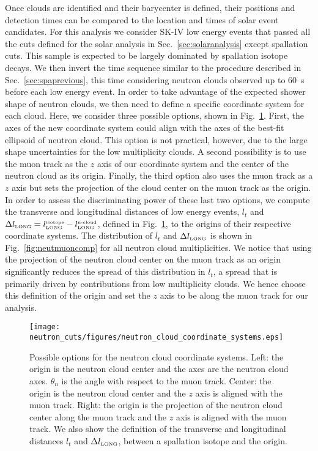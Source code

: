 Once clouds are identified and their barycenter is defined, their positions and detection times can be compared to the location and times of solar event candidates. For this analysis we consider SK-IV low energy events that passed all the cuts defined for the solar analysis in Sec.~\ref{sec:solaranalysis} except spallation cuts. This sample is expected to be largely dominated by spallation isotope decays. We then invert the time sequence similar to the procedure described in Sec.~\ref{sec:spaprevious}, this time considering neutron clouds observed up to 60~s before each low energy event. In order to take advantage of the expected shower shape of neutron clouds, we then need to define a specific coordinate system for each cloud. Here, we consider three possible options, shown in Fig.~\ref{fig:coordinate_systems}. First, the axes of the new coordinate system could align with the axes of the best-fit ellipsoid of neutron cloud. This option is not practical, however, due to the large shape uncertainties for the low multiplicity clouds. A second possibility is to use the muon track as the $z$ axis of our coordinate system and the center of the neutron cloud as its origin. Finally, the third option also uses the muon track as a $z$ axis but sets the projection of the cloud center on the muon track as the origin. In order to assess the discriminating power of these last two options, we compute the transverse and longitudinal distances of low energy events, $l_t$ and $\Delta l_{\mbox{\tiny LONG}}=l_{\mbox{\tiny LONG}}^{\mbox{\tiny isotope}}-l_{\mbox{\tiny LONG}}^{\mbox{\tiny n-cloud}}$, defined in Fig.~\ref{fig:coordinate_systems}, to the origins of their respective coordinate systems. The distribution of $l_t$ and $\Delta l_{\mbox{\tiny LONG}}$ is shown in Fig.~\ref{fig:neutmuoncomp} for all neutron cloud multiplicities. We notice that using the projection of the neutron cloud center on the muon track as an origin significantly reduces the spread of this distribution in $l_t$, a spread that is primarily driven by contributions from low multiplicity clouds. We hence choose this definition of the origin and set the $z$ axis to be along the muon track for our analysis. 

\begin{figure}
    \centering
    \texttt{[image: neutron\_cuts/figures/neutron\_cloud\_coordinate\_systems.eps]} %
    \caption{Possible options for the neutron cloud coordinate systems. Left: the origin is the neutron cloud center and the axes are the neutron cloud axes. $\theta_n$ is the angle with respect to the muon track. Center: the origin is the neutron cloud center and the $z$ axis is aligned with the muon track. Right: the origin is the projection of the neutron cloud center along the muon track and the $z$ axis is aligned with the muon track. We also show the definition of the transverse and longitudinal distances $l_t$ and $\Delta l_{\mbox{\tiny LONG}}$, between a spallation isotope and the origin.}
    \label{fig:coordinate_systems}
\end{figure}

